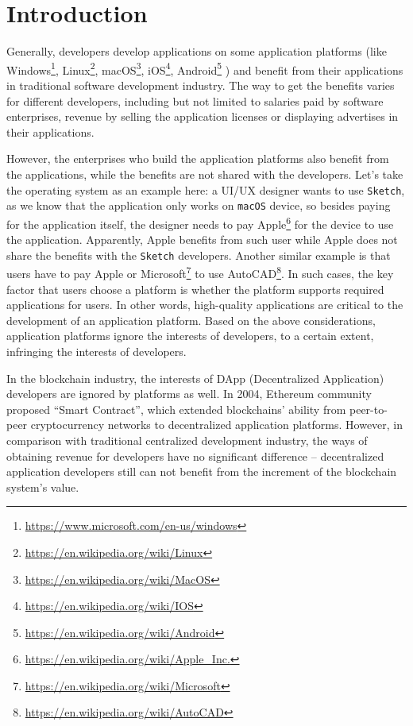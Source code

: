 \section{Introduction}

Generally, developers develop applications on some application platforms (like
Windows\footnote{\url{https://www.microsoft.com/en-us/windows}}, Linux\footnote{\url{https://en.wikipedia.org/wiki/Linux}},
macOS\footnote{\url{https://en.wikipedia.org/wiki/MacOS}},
iOS\footnote{\url{https://en.wikipedia.org/wiki/IOS}},
Android\footnote{\url{https://en.wikipedia.org/wiki/Android}} \etc) and
benefit from their applications in traditional software development industry.
The way to get the benefits varies for different developers, including but not
limited to salaries paid by software enterprises, revenue by selling the
application licenses or displaying advertises in their applications.

However, the enterprises who build the application platforms also benefit
from the applications, while the benefits are not shared with the developers.
Let's take the operating system as an example here: a UI/UX designer wants to use \texttt{Sketch},
as we know that the application only works on \texttt{macOS} device, so besides
paying for the application itself, the designer needs to pay Apple\footnote{\url{https://en.wikipedia.org/wiki/Apple_Inc.}}
for the device  to use the application. Apparently, Apple benefits from such user while
Apple does not share the benefits with the \texttt{Sketch} developers.
Another similar example is that users have to pay Apple or
Microsoft\footnote{\url{https://en.wikipedia.org/wiki/Microsoft}} to use
AutoCAD\footnote{\url{https://en.wikipedia.org/wiki/AutoCAD}}. In such cases,
the key factor that users choose a platform is whether the platform
supports required applications for users. In other words, high-quality
applications are critical to the development of an application platform. Based on the above considerations,  application platforms ignore the interests of developers, to a certain extent, infringing the interests of developers.

In the blockchain industry, the interests of
DApp (Decentralized Application) developers are ignored by platforms  as  well.
 In 2004, Ethereum community proposed ``Smart Contract'',
which extended blockchains' ability from peer-to-peer
cryptocurrency networks to decentralized application platforms. However, in comparison with traditional centralized development industry, the ways of obtaining revenue for developers have no significant difference -- decentralized application developers still can not benefit
 from the increment of the blockchain system's value.

